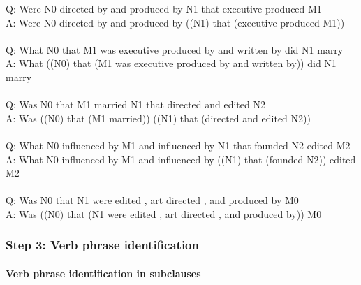 \documentclass{article} \usepackage{iclr2022_conference,times}
\begin{document}
{Q: Were N0 directed by and produced by N1 that executive produced M1 \\
A: Were N0 directed by and produced by ((N1) that (executive produced M1)) \\
 \\
Q: What N0 that M1 was executive produced by and written by did N1 marry \\
A: What ((N0) that (M1 was executive produced by and written by)) did N1 marry \\
 \\
Q: Was N0 that M1 married N1 that directed and edited N2 \\
A: Was ((N0) that (M1 married)) ((N1) that (directed and edited N2)) \\
 \\
Q: What N0 influenced by M1 and influenced by N1 that founded N2 edited M2 \\
A: What N0 influenced by M1 and influenced by ((N1) that (founded N2)) edited M2 \\
 \\
Q: Was N0 that N1 were edited , art directed , and produced by M0 \\
A: Was ((N0) that (N1 were edited , art directed , and produced by)) M0
}

\subsubsection{Step 3: Verb phrase identification}

\paragraph{Verb phrase identification in subclauses}
\end{document}
